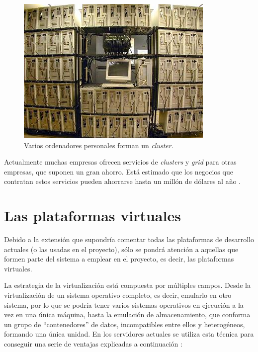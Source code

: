 \begin{figure}[h]
	\centering
	\includegraphics[scale=0.9]{images/cluster.png}
	\caption[\emph{Cluster}]{Varios ordenadores personales forman un \emph{cluster}.}
	\label{fig:cluster}
\end{figure}

Actualmente muchas empresas ofrecen servicios de \emph{clusters} y 
\emph{grid} para otras empresas, que suponen un gran ahorro. Está 
estimado que los negocios que contratan estos servicios pueden 
ahorrarse hasta un millón de dólares al año \cite{amazon}.

\section{Las plataformas virtuales }
Debido a la extensión que supondría comentar todas las plataformas de 
desarrollo actuales (o las usadas en el proyecto), sólo se pondrá 
atención a aquellas que formen parte del sistema a emplear en el 
proyecto, es decir, las plataformas virtuales.

La estrategia de la virtualización está compuesta por múltiples 
campos. Desde la virtualización de un sistema operativo completo, es 
decir, emularlo en otro sistema, por lo que se podría tener varios 
sistemas operativos en ejecución a la vez en una única máquina, hasta 
la emulación de almacenamiento, que conforma un grupo de 
``contenedores'' de datos, incompatibles entre ellos y heterogéneos, 
formando una única unidad. En los servidores actuales se utiliza esta 
técnica para conseguir una serie de ventajas explicadas a 
continuación \cite{vmware}:

